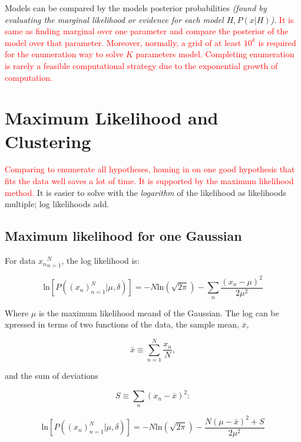 \documentclass[11pt]{article}
\begin{document}
Models can be compared by the models \textquotesingle posterior probabilities \textit{(found by evaluating the marginal likelihood or evidence for each model $H, P({x}|H)$)}. \textcolor{red}{It is same as finding marginal over one parameter and compare the posterior of the model over that parameter. Moreover, normally, a grid of at least $10^k$ is required for the enumeration way to solve $K$ parameters model. Completing enumeration is rarely a feasible computational strategy due to the exponential growth of computation.}






\newpage

\section{Maximum Likelihood and Clustering}
\textcolor{red}{Comparing to enumerate all hypotheses, homing in on one good hypothesis that fits the data well saves a lot of time. It is supported by the maximum likelihood method.} It is easier to solve with the \textit{logarithm} of the likelihood as likelihoods multiple; log likelihoods add. 

\subsection{Maximum likelihood for one Gaussian}
For data ${x_n}^N_{n=1}$, the log likelihood is:

\begin{equation}
  \mathrm{ln}[P((x_n)^N_{n=1}|\mu,\delta)] = -N \mathrm{ln}(\sqrt{2\pi}) - \sum_n \frac{(x_n - \mu)^2}{2 \mu^2}
  \label{equation:maximum1}
\end{equation}

Where $\mu$ is the maximum likelihood meand of the Gaussian. The log can be xpressed in terms of two functions of the data, the sample mean, $\bar{x}$,

\begin{equation}
  \bar{x} \equiv \sum_{n=1}^N \frac{x_n}{N},
  \label{equation:maximum2}
\end{equation}

and the sum of deviations

\begin{equation}
  S \equiv  \sum_n (x_n - \bar{x})^2 :
  \label{equation:maximum3}
\end{equation}

\begin{equation}
  \mathrm{ln}[P((x_n)^N_{n=1}|\mu,\delta)] = -N \mathrm{ln}(\sqrt{2\pi}) - \frac{N(\mu - \bar{x})^2 + S}{2 \mu^2}
  \label{equation:maximum4}
\end{equation}
\end{document}
